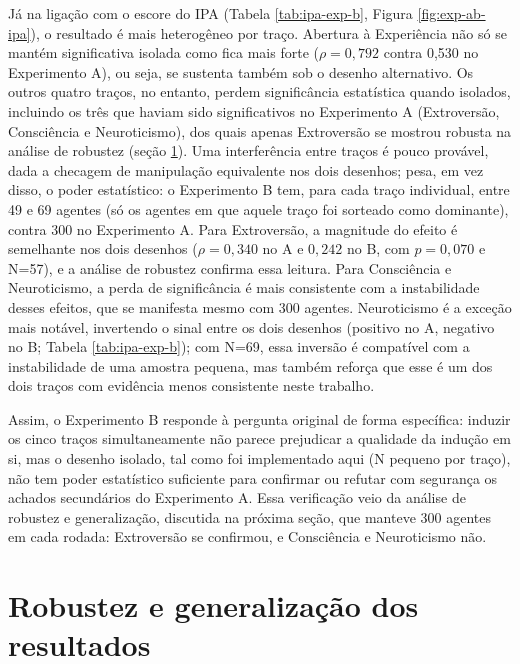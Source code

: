 Já na ligação com o escore do IPA (Tabela \ref{tab:ipa-exp-b},
Figura \ref{fig:exp-ab-ipa}), o resultado é mais heterogêneo por traço.
Abertura à Experiência não só se mantém significativa isolada como fica
mais forte ($\rho=0{,}792$ contra 0,530 no Experimento A), ou seja, se
sustenta também sob o desenho alternativo. Os
outros quatro traços, no entanto, perdem significância estatística
quando isolados, incluindo os três que haviam sido significativos no
Experimento A (Extroversão, Consciência e Neuroticismo), dos quais apenas
Extroversão se mostrou robusta na análise de robustez (seção
\ref{sec:discussao-robustez}). Uma interferência entre traços é pouco
provável, dada a checagem de manipulação equivalente nos dois desenhos;
pesa, em vez disso, o poder estatístico: o Experimento B tem,
para cada traço individual, entre 49 e 69 agentes (só os agentes em que
aquele traço foi sorteado como dominante), contra 300 no Experimento A.
Para Extroversão, a magnitude do efeito é semelhante nos dois desenhos
($\rho=0{,}340$ no A e $0{,}242$ no B, com $p=0{,}070$ e N=57), e a
análise de robustez confirma essa leitura. Para Consciência e
Neuroticismo, a perda de significância é mais consistente com a
instabilidade desses efeitos, que se manifesta mesmo com 300 agentes.
Neuroticismo é a exceção mais notável, invertendo o sinal entre os dois
desenhos (positivo no A, negativo no B; Tabela \ref{tab:ipa-exp-b}); com
N=69, essa inversão é compatível com a instabilidade de uma amostra
pequena, mas também reforça que esse é um dos dois traços com evidência
menos consistente neste trabalho.

Assim, o Experimento B responde à pergunta original de forma
específica: induzir os cinco traços simultaneamente não parece
prejudicar a qualidade da indução em si, mas o desenho isolado, tal como
foi implementado aqui (N pequeno por traço), não tem poder estatístico
suficiente para confirmar ou refutar com segurança os achados
secundários do Experimento A. Essa verificação veio da análise
de robustez e generalização, discutida na próxima seção, que manteve 300
agentes em cada rodada: Extroversão se confirmou, e Consciência e
Neuroticismo não.

\section{Robustez e generalização dos resultados}
\label{sec:discussao-robustez}

